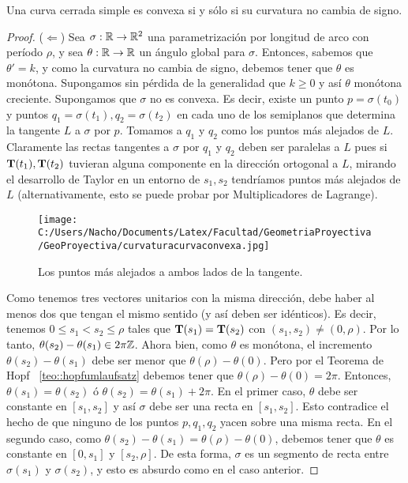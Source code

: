 \begin{teo}
Una curva cerrada simple es convexa si y sólo si su curvatura no cambia de signo.
\begin{proof}
\hfill

($\Longleftarrow$) Sea $\sigma:\mathbb{R}\to\mathbb{R}^2$ una parametrización por longitud de arco con período $\rho$, y sea $\theta:\mathbb{R}\to\mathbb{R}$ un ángulo global para $\sigma$. Entonces, sabemos que $\theta'=k$, y como la curvatura no cambia de signo, debemos tener que $\theta$ es monótona. Supongamos sin pérdida de la generalidad que $k\geq 0$ y así $\theta$ monótona creciente. Supongamos que $\sigma$ no es convexa. Es decir, existe un punto $p=\sigma(t_0)$ y puntos $q_1=\sigma(t_1),q_2=\sigma(t_2)$ en cada uno de los semiplanos que determina la tangente $L$ a $\sigma$ por $p$. Tomamos a $q_1$ y $q_2$ como los puntos más alejados de $L$. Claramente las rectas tangentes a $\sigma$ por $q_1$ y $q_2$ deben ser paralelas a $L$ pues si $\operatorname{\mathbf{T}}(t_1),\operatorname{\mathbf{T}}(t_2)$ tuvieran alguna componente en la dirección ortogonal a $L$, mirando el desarrollo de Taylor en un entorno de $s_1, s_2$ tendríamos puntos más alejados de $L$ (alternativamente, esto se puede probar por Multiplicadores de Lagrange).

\begin{figure}[h]
	\centering
		\texttt{[image: C:/Users/Nacho/Documents/Latex/Facultad/GeometriaProyectiva/GeoProyectiva/curvaturacurvaconvexa.jpg]}
	\caption{Los puntos más alejados a ambos lados de la tangente.}
	\label{fig:curvaturacurvaconvexa}
\end{figure}

Como tenemos tres vectores unitarios con la misma dirección, debe haber al menos dos que tengan el mismo sentido (y así deben ser idénticos). Es decir, tenemos $0\leq s_1<s_2\leq \rho$ tales que $\operatorname{\mathbf{T}}(s_1)=\operatorname{\mathbf{T}}(s_2)$ con $(s_1,s_2)\neq (0,\rho)$. Por lo tanto, $\theta(s_2)-\theta(s_1)\in 2\pi\mathbb{Z}$. Ahora bien, como $\theta$ es monótona, el incremento $\theta(s_2)-\theta(s_1)$ debe ser menor que $\theta(\rho)-\theta(0)$. Pero por el Teorema de Hopf ~\ref{teo::hopfumlaufsatz} debemos tener que $\theta(\rho)-\theta(0)=2\pi$. Entonces, $\theta(s_1)=\theta(s_2)$ ó $\theta(s_2)=\theta(s_1)+2\pi$. En el primer caso, $\theta$ debe ser constante en $[s_1,s_2]$ y así $\sigma$ debe ser una recta en $[s_1,s_2]$. Esto contradice el hecho de que ninguno de los puntos $p,q_1,q_2$ yacen sobre una misma recta. En el segundo caso, como $\theta(s_2)-\theta(s_1)=\theta(\rho)-\theta(0)$, debemos tener que $\theta$ es constante en $[0,s_1]$ y $[s_2,\rho]$. De esta forma, $\sigma$ es un segmento de recta entre $\sigma(s_1)$ y $\sigma(s_2)$, y esto es absurdo como en el caso anterior.


\end{proof}
\end{teo}

